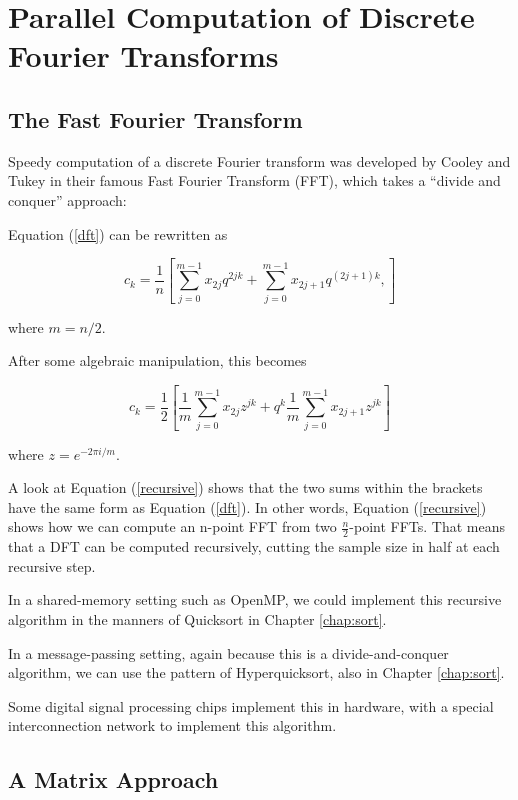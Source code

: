 \section{Parallel Computation of Discrete Fourier Transforms}

\subsection{The Fast Fourier Transform}

Speedy computation of a discrete Fourier transform was developed
by Cooley and Tukey in their famous Fast Fourier Transform (FFT), which
takes a ``divide and conquer'' approach:

Equation (\ref{dft}) can be rewritten as

\begin{equation}
c_k = \frac{1}{n} \left [ 
\sum_{j=0}^{m-1} x_{2j} {q}^{2jk} +
\sum_{j=0}^{m-1} x_{2j+1} {q}^{(2j+1)k} ,
\right ] 
\end{equation}

where $m = n/2$. 

After some algebraic manipulation, this becomes

\begin{equation}
\label{recursive} 
c_k = \frac{1}{2} \left [ 
\frac{1}{m} \sum_{j=0}^{m-1} x_{2j} z^{jk} +
q^k \frac{1}{m} \sum_{j=0}^{m-1} x_{2j+1} z^{jk} 
\right ] 
\end{equation}

where $z = e^{-2\pi i/m}$.

A look at Equation (\ref{recursive}) shows that the two sums within the
brackets have the same form as Equation (\ref{dft}).  In other words,
Equation (\ref{recursive}) shows how we can compute an n-point FFT from
two $\frac{n}{2}$-point FFTs.  That means that a DFT can be computed
recursively, cutting the sample size in half at each recursive step. 

In a shared-memory setting such as OpenMP, we could implement this
recursive algorithm in the manners of Quicksort in Chapter
\ref{chap:sort}.  

In a message-passing setting, again because this is a divide-and-conquer
algorithm, we can use the pattern of Hyperquicksort, also in
Chapter \ref{chap:sort}.  

Some digital signal processing chips implement this in hardware, with a
special interconnection network to implement this algorithm.

\subsection{A Matrix Approach}

